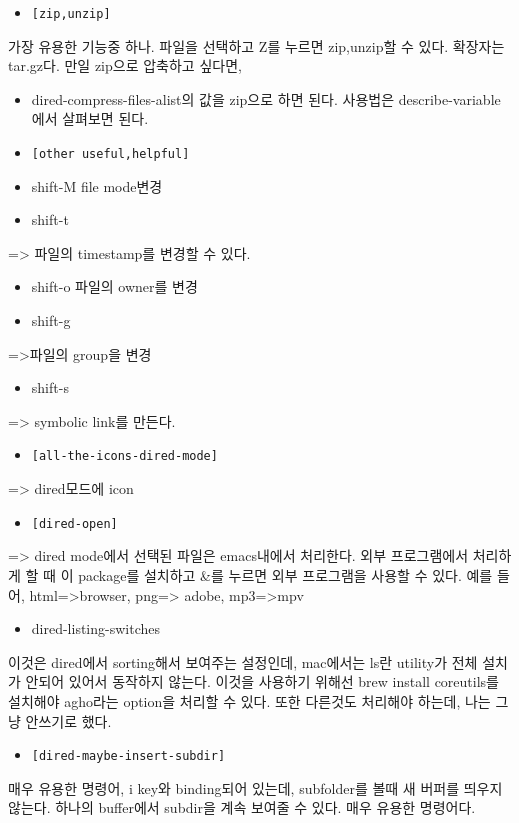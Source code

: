 \documentclass[11pt]{article}
\begin{document}
\begin{itemize}
\item \texttt{[zip,unzip]}
\end{itemize}
가장 유용한 기능중 하나. 파일을 선택하고 Z를 누르면 zip,unzip할 수 있다. 확장자는 tar.gz다.
만일 zip으로 압축하고 싶다면,
\begin{itemize}
\item dired-compress-files-alist의 값을 zip으로 하면 된다. 사용법은 describe-variable에서 살펴보면 된다.

\item \texttt{[other useful,helpful]}
\item shift-M
file mode변경
\item shift-t
\end{itemize}
=> 파일의 timestamp를 변경할 수 있다.
\begin{itemize}
\item shift-o
파일의 owner를 변경
\item shift-g
\end{itemize}
=>파일의 group을 변경
\begin{itemize}
\item shift-s
\end{itemize}
=> symbolic link를 만든다.

\begin{itemize}
\item \texttt{[all-the-icons-dired-mode]}
\end{itemize}
=> dired모드에 icon

\begin{itemize}
\item \texttt{[dired-open]}
\end{itemize}
=> dired mode에서 선택된 파일은 emacs내에서 처리한다. 외부 프로그램에서 처리하게 할 때 이 package를 설치하고 \&를 누르면 외부 프로그램을 사용할 수 있다.
예를 들어, html=>browser, png=> adobe, mp3=>mpv

\begin{itemize}
\item dired-listing-switches
\end{itemize}
이것은 dired에서 sorting해서 보여주는 설정인데, mac에서는 ls란 utility가 전체 설치가 안되어 있어서 동작하지 않는다. 이것을 사용하기 위해선 brew install coreutils를 설치해야 agho라는 option을 처리할 수 있다. 또한 다른것도 처리해야 하는데, 나는 그냥 안쓰기로 했다.

\begin{itemize}
\item \texttt{[dired-maybe-insert-subdir]}
\end{itemize}
매우 유용한 명령어, i key와 binding되어 있는데, subfolder를 볼때 새 버퍼를 띄우지 않는다. 하나의 buffer에서 subdir을 계속 보여줄 수 있다. 매우 유용한 명령어다.
\end{document}

